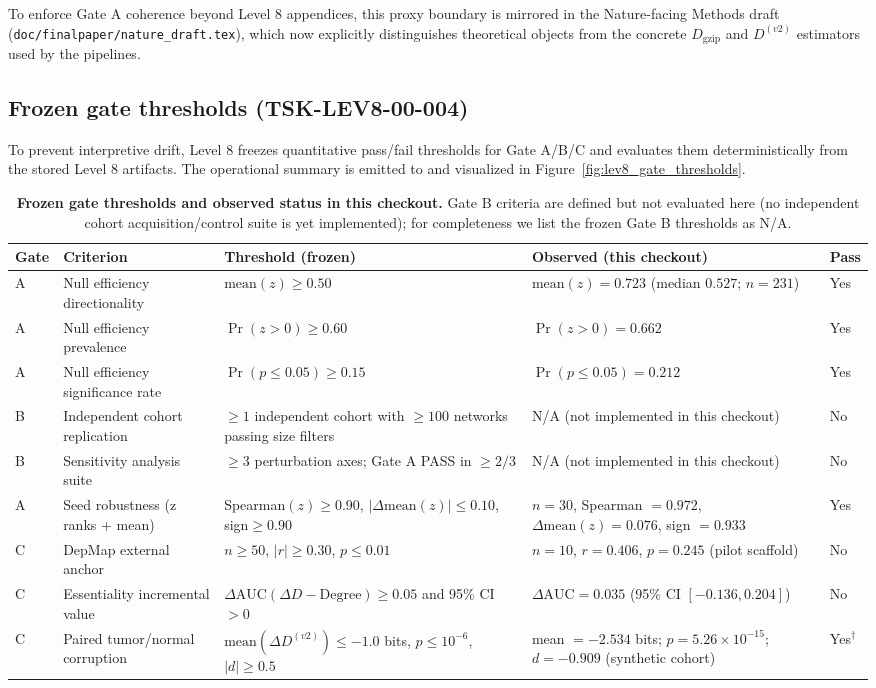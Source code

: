 \documentclass[11pt]{article}
\begin{document}
To enforce Gate A coherence beyond Level 8 appendices, this proxy boundary is mirrored in the Nature-facing Methods draft (\texttt{doc/finalpaper/nature\_draft.tex}), which now explicitly distinguishes theoretical objects from the concrete $D_{\mathrm{gzip}}$ and $D^{(v2)}$ estimators used by the pipelines.

\subsection*{Frozen gate thresholds (TSK-LEV8-00-004)}
To prevent interpretive drift, Level 8 freezes quantitative pass/fail thresholds for Gate A/B/C and evaluates them deterministically from the stored Level 8 artifacts. The operational summary is emitted to  and visualized in Figure~\ref{fig:lev8_gate_thresholds}.

\begin{table}[H]
\centering
\caption{\textbf{Frozen gate thresholds and observed status in this checkout.} Gate B criteria are defined but not evaluated here (no independent cohort acquisition/control suite is yet implemented); for completeness we list the frozen Gate B thresholds as N/A.}
\label{tab:lev8_gate_thresholds}
\begin{tabular}{@{}p{0.7cm}p{3.7cm}p{4.1cm}p{4.2cm}p{0.8cm}@{}}
\toprule
\textbf{Gate} & \textbf{Criterion} & \textbf{Threshold (frozen)} & \textbf{Observed (this checkout)} & \textbf{Pass} \\
\midrule
A & Null efficiency directionality & $\mathrm{mean}(z)\ge 0.50$ & $\mathrm{mean}(z)=0.723$ (median $0.527$; $n=231$) & Yes \\
A & Null efficiency prevalence & $\Pr(z>0)\ge 0.60$ & $\Pr(z>0)=0.662$ & Yes \\
A & Null efficiency significance rate & $\Pr(p\le 0.05)\ge 0.15$ & $\Pr(p\le 0.05)=0.212$ & Yes \\
B & Independent cohort replication & $\ge 1$ independent cohort with $\ge 100$ networks passing size filters & N/A (not implemented in this checkout) & No \\
B & Sensitivity analysis suite & $\ge 3$ perturbation axes; Gate A PASS in $\ge 2/3$ & N/A (not implemented in this checkout) & No \\
A & Seed robustness (z ranks + mean) & Spearman$(z)\ge 0.90$, $|\Delta\mathrm{mean}(z)|\le 0.10$, sign$\ge 0.90$ & $n=30$, Spearman $=0.972$, $\Delta\mathrm{mean}(z)=0.076$, sign $=0.933$ & Yes \\
C & DepMap external anchor & $n\ge 50$, $|r|\ge 0.30$, $p\le 0.01$ & $n=10$, $r=0.406$, $p=0.245$ (pilot scaffold) & No \\
C & Essentiality incremental value & $\Delta\mathrm{AUC}(\Delta D-\mathrm{Degree})\ge 0.05$ and 95\% CI $>0$ & $\Delta\mathrm{AUC}=0.035$ (95\% CI $[-0.136,0.204]$) & No \\
C & Paired tumor/normal corruption & $\mathrm{mean}(\Delta D^{(v2)})\le -1.0$ bits, $p\le 10^{-6}$, $|d|\ge 0.5$ & mean $=-2.534$ bits; $p=5.26\times 10^{-15}$; $d=-0.909$ (synthetic cohort) & Yes$^\dagger$ \\
\bottomrule
\end{tabular}
\end{table}
\end{document}
